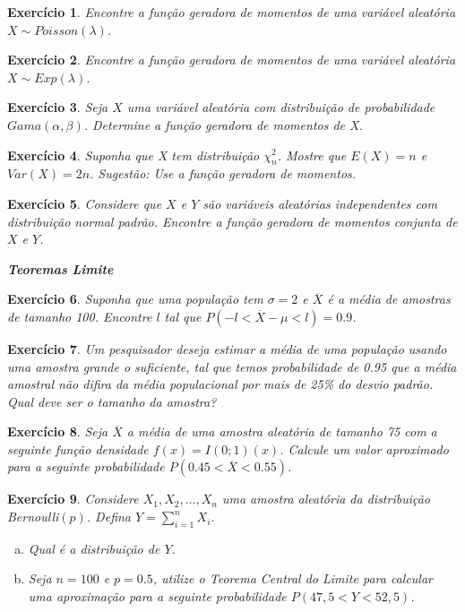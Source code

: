 \documentclass[letter,11pt]{article}
\newtheorem{exer}{Exercício}
\begin{document}
\medskip 
\begin{exer} \rm
Encontre a função geradora de momentos de uma variável aleatória $X \sim Poisson(\lambda)$.
\end{exer}


\begin{exer} \rm
Encontre a função geradora de momentos de uma variável aleatória $X \sim Exp(\lambda)$.
\end{exer}


\begin{exer} \rm
Seja $X$ uma variável aleatória com distribuição de probabilidade $Gama (\alpha, \beta)$. Determine a função geradora de momentos de X.
\end{exer}


\begin{exer} \rm
Suponha que X tem distribuição $\chi^2_n$. Mostre que $E(X) = n$ e $Var(X) = 2n$.
Sugestão: Use a função geradora de momentos.
\end{exer}


\begin{exer} \rm
Considere que $X$ e $Y$ são variáveis aleatórias independentes com distribuição 
normal padrão. Encontre a função geradora de momentos conjunta de $X$ e $Y$.
\end{exer}


\medskip
\medskip
\noindent \textit{\textbf{Teoremas Limite}}

\begin{exer} \rm
Suponha que uma população tem $\sigma=2$ e $\overline{X}$ é a média de amostras 
de tamanho 100. Encontre $l$ tal que $P(-l < \overline{X}-\mu < l)=0.9$.
\end{exer}


\begin{exer} \rm
Um pesquisador deseja estimar a média de uma população usando uma amostra grande 
o suficiente, tal que temos probabilidade de 0.95 que a média amostral não 
difira da média populacional por mais de 25\% do desvio padrão. Qual deve ser o 
tamanho da amostra?
\end{exer}


\begin{exer} \rm
Seja $\overline{X}$ a média de uma amostra aleatória de tamanho 75 com a 
seguinte função densidade $f(x) = I(0;1)(x)$. Calcule um valor aproximado para 
a seguinte probabilidade $P(0.45 < \overline{X} < 0.55)$.
\end{exer}


\begin{exer} \rm
Considere $X_1, X_2, \ldots, X_n$ uma amostra aleatória da distribuição 
Bernoulli$(p)$. Defina $Y= \sum_{i=1}^n X_i$.
\begin{enumerate}[a)]
  \item Qual é a distribuição de $Y$.
  \item Seja $n = 100$ e $p = 0.5$, utilize o Teorema Central do Limite para 
  calcular uma aproximação para a seguinte probabilidade $P(47,5 < Y < 52,5)$.
\end{enumerate}
\end{exer}
\end{document}

